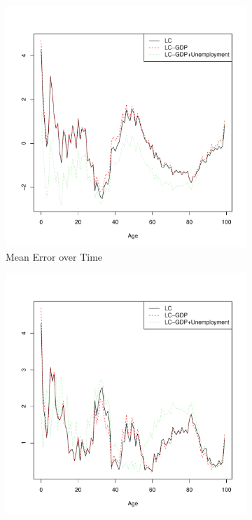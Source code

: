 \documentclass[AER, draftmode]{AEA}
\begin{document}
\begin{figure}[!htp]
	\begin{subfigure}{0.4\textwidth}
		\includegraphics[width=\linewidth]{CAN_pred_error_age_male} 
		\caption{Mean Error over Time}
		\label{fig:prederrora}
	\end{subfigure}
	\begin{subfigure}{0.4\textwidth}
		\includegraphics[width=\linewidth]{CAN_abs_pred_error_age_male} 

\end{subfigure}
\end{figure}
\end{document}
